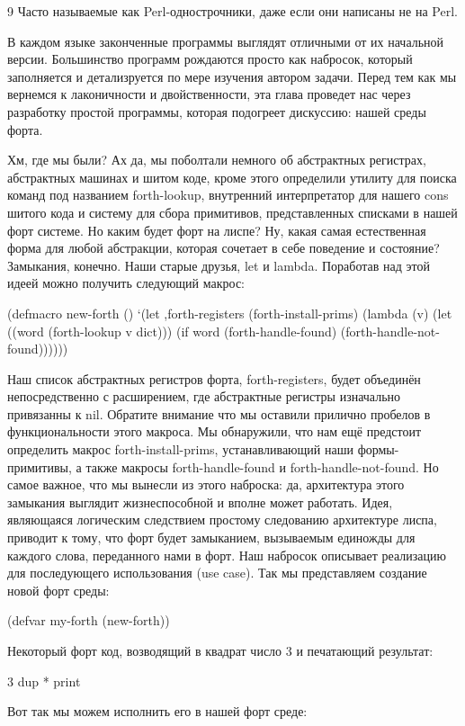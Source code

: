 9 Часто называемые как Perl-однострочники, даже если они написаны не на Perl.

В каждом языке законченные программы выглядят отличными от их начальной версии. Большинство программ рождаются просто как набросок, который заполняется и детализруется по мере изучения автором задачи. Перед тем как мы вернемся к лаконичности и двойственности, эта глава проведет нас через разработку простой программы, которая подогреет дискуссию: нашей среды форта.

Хм, где мы были? Ах да, мы поболтали немного об абстрактных регистрах, абстрактных машинах и шитом коде, кроме этого определили утилиту для поиска команд под названием forth-lookup, внутренний интерпретатор для нашего cons шитого кода и систему для сбора примитивов, представленных списками в нашей форт системе. Но каким будет форт на лиспе? Ну, какая самая естественная форма для любой абстракции, которая сочетает в себе поведение и состояние? Замыкания, конечно. Наши старые друзья, let и lambda. Поработав над этой идеей можно получить следующий макрос: 

(defmacro new-forth ()
  ‘(let ,forth-registers
      (forth-install-prims)
      (lambda (v)
         (let ((word (forth-lookup v dict)))
            (if word
              (forth-handle-found)
              (forth-handle-not-found))))))

Наш список абстрактных регистров форта, forth-registers, будет объединён непосредственно с расширением, где абстрактные регистры изначально привязанны к nil. Обратите внимание что мы оставили прилично пробелов в функциональности этого макроса. Мы обнаружили, что нам ещё предстоит определить макрос forth-install-prims, устанавливающий наши формы-примитивы, а также макросы forth-handle-found и forth-handle-not-found. Но самое важное, что мы вынесли из этого наброска: да, архитектура этого замыкания выглядит жизнеспособной и вполне может работать. Идея, являющаяся логическим следствием простому следованию архитектуре лиспа, приводит к тому, что форт будет замыканием, вызываемым единожды для каждого слова, переданного нами в форт. Наш набросок описывает реализацию для последующего использования (use case). Так мы представляем создание новой форт среды:

(defvar my-forth (new-forth))

Некоторый форт код, возводящий в квадрат число 3 и печатающий результат:

3 dup * print

Вот так мы можем исполнить его в нашей форт среде:

